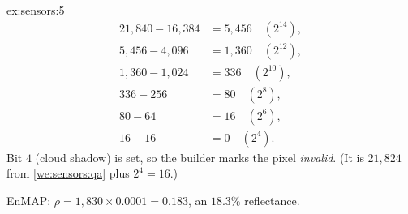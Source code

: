 \begin{solution}{ex:sensors:5}
\begin{align*}
21{,}840 - 16{,}384 &= 5{,}456 \quad (2^{14}),\\
5{,}456 - 4{,}096 &= 1{,}360 \quad (2^{12}),\\
1{,}360 - 1{,}024 &= 336 \quad (2^{10}),\\
336 - 256 &= 80 \quad (2^{8}),\\
80 - 64 &= 16 \quad (2^{6}),\\
16 - 16 &= 0 \quad (2^{4}).
\end{align*}
Bit $4$ (cloud shadow) is set, so the builder marks the pixel \emph{invalid}. (It is
$21{,}824$ from \cref{we:sensors:qa} plus $2^4 = 16$.)

EnMAP: $\rho = 1{,}830 \times 0.0001 = 0.183$, an $18.3\%$ reflectance.
\end{solution}
